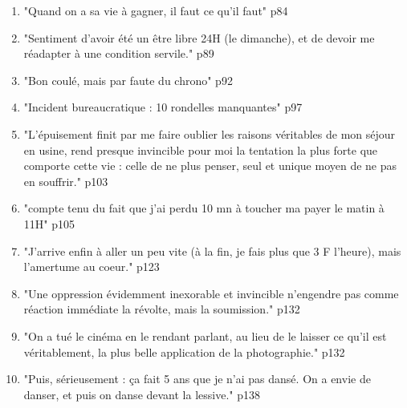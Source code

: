 \documentclass[a4paper,12pt]{book}
\begin{document}
{\begin{enumerate}
\item "Quand on a sa vie à gagner, il faut ce qu'il faut" p84
\item "Sentiment d'avoir été un être libre 24H (le dimanche), et de devoir me réadapter à une condition servile." p89
\item "Bon coulé, mais par faute du chrono" p92
\item "Incident bureaucratique : 10 rondelles manquantes" p97
\item "L'épuisement finit par me faire oublier les raisons véritables de mon séjour en usine, rend presque invincible pour moi la tentation la plus forte que comporte cette vie : celle de ne plus penser, seul et unique moyen de ne pas en souffrir." p103
\item "compte tenu du fait que j'ai perdu 10 mn à toucher ma payer le matin à 11H" p105
\item "J'arrive enfin à aller un peu vite (à la fin, je fais plus que 3 F l'heure), mais l'amertume au coeur." p123
\item "Une oppression évidemment inexorable et invincible n'engendre pas comme réaction immédiate la révolte, mais la soumission." p132
\item "On a tué le cinéma en le rendant parlant, au lieu de le laisser ce qu'il est véritablement, la plus belle application de la photographie." p132
\item "Puis, sérieusement : ça fait 5 ans que je n'ai pas dansé. On a envie de danser, et puis on danse devant la lessive." p138
\end{enumerate}}
\end{document}
